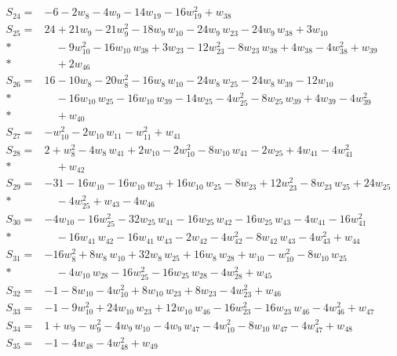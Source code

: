 \documentclass[11pt]{article}
\theoremstyle{remark}\newtheorem{remark}[theorem]{Remark}
\begin{document}
\begin{align*}
S_{24}={}& -6 - 2w_{8} - 4w_{9} - 14w_{19} - 16w_{19}^{2} + w_{38} \\[2pt]
S_{25}={}& 24 + 21w_{9} - 21w_{9}^{2} - 18w_{9}\,w_{10} - 24w_{9}\,w_{23} - 24w_{9}\,w_{38} + 3w_{10} \\*
&\quad  - 9w_{10}^{2} - 16w_{10}\,w_{38} + 3w_{23} - 12w_{23}^{2} - 8w_{23}\,w_{38} + 4w_{38} - 4w_{38}^{2} + w_{39} \\*
&\quad  + 2w_{46} \\[2pt]
S_{26}={}& 16 - 10w_{8} - 20w_{8}^{2} - 16w_{8}\,w_{10} - 24w_{8}\,w_{25} - 24w_{8}\,w_{39} - 12w_{10} \\*
&\quad  - 16w_{10}\,w_{25} - 16w_{10}\,w_{39} - 14w_{25} - 4w_{25}^{2} - 8w_{25}\,w_{39} + 4w_{39} - 4w_{39}^{2} \\*
&\quad  + w_{40} \\[2pt]
S_{27}={}& -w_{10}^{2} - 2w_{10}\,w_{11} - w_{11}^{2} + w_{41} \\[2pt]
S_{28}={}& 2 + w_{8}^{2} - 4w_{8}\,w_{41} + 2w_{10} - 2w_{10}^{2} - 8w_{10}\,w_{41} - 2w_{25} + 4w_{41} - 4w_{41}^{2} \\*
&\quad  + w_{42} \\[2pt]
S_{29}={}& -31 - 16w_{10} - 16w_{10}\,w_{23} + 16w_{10}\,w_{25} - 8w_{23} + 12w_{23}^{2} - 8w_{23}\,w_{25} + 24w_{25} \\*
&\quad  - 4w_{25}^{2} + w_{43} - 4w_{46} \\[2pt]
S_{30}={}& -4w_{10} - 16w_{25}^{2} - 32w_{25}\,w_{41} - 16w_{25}\,w_{42} - 16w_{25}\,w_{43} - 4w_{41} - 16w_{41}^{2} \\*
&\quad  - 16w_{41}\,w_{42} - 16w_{41}\,w_{43} - 2w_{42} - 4w_{42}^{2} - 8w_{42}\,w_{43} - 4w_{43}^{2} + w_{44} \\[2pt]
S_{31}={}& -16w_{8}^{2} + 8w_{8}\,w_{10} + 32w_{8}\,w_{25} + 16w_{8}\,w_{28} + w_{10} - w_{10}^{2} - 8w_{10}\,w_{25} \\*
&\quad  - 4w_{10}\,w_{28} - 16w_{25}^{2} - 16w_{25}\,w_{28} - 4w_{28}^{2} + w_{45} \\[2pt]
S_{32}={}& -1 - 8w_{10} - 4w_{10}^{2} + 8w_{10}\,w_{23} + 8w_{23} - 4w_{23}^{2} + w_{46} \\[2pt]
S_{33}={}& -1 - 9w_{10}^{2} + 24w_{10}\,w_{23} + 12w_{10}\,w_{46} - 16w_{23}^{2} - 16w_{23}\,w_{46} - 4w_{46}^{2} + w_{47} \\[2pt]
S_{34}={}& 1 + w_{9} - w_{9}^{2} - 4w_{9}\,w_{10} - 4w_{9}\,w_{47} - 4w_{10}^{2} - 8w_{10}\,w_{47} - 4w_{47}^{2} + w_{48} \\[2pt]
S_{35}={}& -1 - 4w_{48} - 4w_{48}^{2} + w_{49} \\[2pt]

\end{align*}
\end{document}
